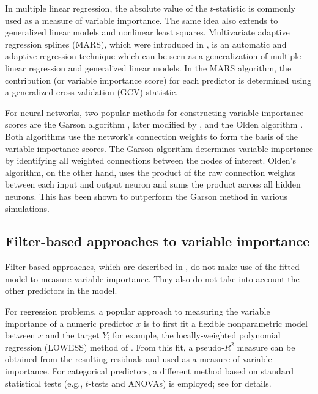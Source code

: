 \documentclass[12pt]{article}
\begin{document}
In multiple linear regression, the absolute value of the $t$-statistic is commonly used as a measure of variable importance. The same idea also extends to generalized linear models and nonlinear least squares. Multivariate adaptive regression splines (MARS), which were introduced in \citet{friedman-1991-mars}, is an automatic and adaptive regression technique which can be seen as a generalization of multiple linear regression and generalized linear models. In the MARS algorithm, the contribution (or variable importance score) for each predictor is determined using a generalized cross-validation (GCV) statistic.

For neural networks, two popular methods for constructing variable importance scores are the Garson algorithm \citep{interpreting-garson-1991}, later modified by \citet{back-goh-1995}, and the Olden algorithm \citep{accurate-olden-2004}. Both algorithms use the network's connection weights to form the basis of the variable importance scores. The Garson algorithm determines variable importance by identifying all weighted connections between the nodes of interest. Olden's algorithm, on the other hand, uses the product of the raw connection weights between each input and output neuron and sums the product across all hidden neurons. This has been shown to outperform the Garson method in various simulations.


\subsection{Filter-based approaches to variable importance}

Filter-based approaches, which are described in \citet[chap. 18]{applied-kuhn-2013}, do not make use of the fitted model to measure variable importance. They also do not take into account the other predictors in the model.

For regression problems, a popular approach to measuring the variable importance of a numeric predictor $x$ is to first fit a flexible nonparametric model between $x$ and the target $Y$; for example, the locally-weighted polynomial regression (LOWESS) method of \citet{robust-cleveland-1979}. From this fit, a pseudo-$R^2$ measure can be obtained from the resulting residuals and used as a measure of variable importance. For categorical predictors, a different method based on standard statistical tests (e.g., $t$-tests and ANOVAs) is employed; see \citet[chap. 18]{applied-kuhn-2013} for details.
\end{document}
